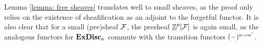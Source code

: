 \begin{remark}
	\label{remark: free small sheaves}
	
	Lemma \ref{lemma: free sheaves} translates well to small sheaves, as the proof only relies on the existence of sheafification as an adjoint to the forgetful functor. It is also clear that for a small (pre)sheaf ${\mathcal{F}}$, the presheaf ${\underline{{\mathbb{Z}}}^p[{\mathcal{F}}]}$ is again small, as the analogous functors for ${\mathbf{ExDisc}}_{\kappa}$ commute with the transition functors $(-)^{\kappa\rightsquigarrow \kappa'}$.
\end{remark}

